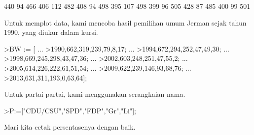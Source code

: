 \documentclass[a4paper,10pt]{article}
\begin{document}
\begin{eulernotebook}
\begin{eulercomment}
\begin{eulercomment}
\begin{eulercomment}
\begin{eulercomment}
\begin{euleroutput}
            440            94           466 
            406           112           482 
            408            94           498 
            395           107           498 
            399            96           505 
            428            87           485 
            400            99           501 
\end{euleroutput}
\begin{eulercomment}
Untuk memplot data, kami mencoba hasil pemilihan umum Jerman sejak
tahun 1990, yang diukur dalam kursi.
\end{eulercomment}
\begin{eulerprompt}
>BW := [ ...
>1990,662,319,239,79,8,17; ...
>1994,672,294,252,47,49,30; ...
>1998,669,245,298,43,47,36; ...
>2002,603,248,251,47,55,2; ...
>2005,614,226,222,61,51,54; ...
>2009,622,239,146,93,68,76; ...
>2013,631,311,193,0,63,64];
\end{eulerprompt}
\begin{eulercomment}
Untuk partai-partai, kami menggunakan serangkaian nama.
\end{eulercomment}
\begin{eulerprompt}
>P:=["CDU/CSU","SPD","FDP","Gr","Li"];
\end{eulerprompt}
\begin{eulercomment}
Mari kita cetak persentasenya dengan baik.


\end{eulercomment}
\end{eulercomment}
\end{eulercomment}
\end{eulercomment}
\end{eulercomment}
\end{eulernotebook}
\end{document}
